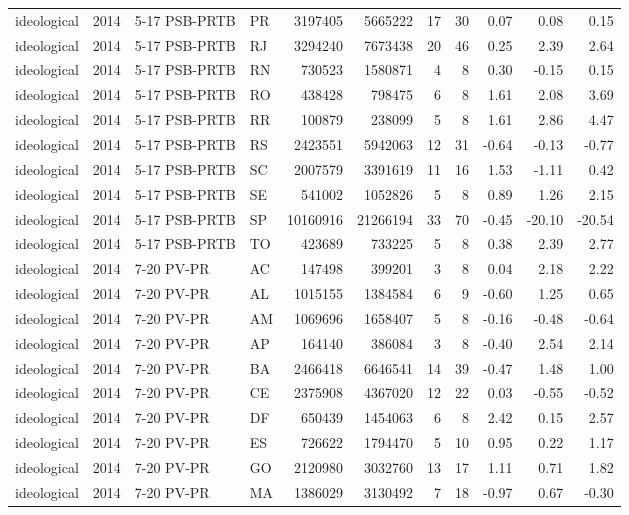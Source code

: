 \begin{landscape}
\begin{longtable}{lllL{1.4cm}rrrrrrr}
ideological & 2014 & 5-17 PSB-PRTB & PR & 3197405 & 5665222 & 17 & 30 & 0.07 & 0.08 & 0.15 \\
ideological & 2014 & 5-17 PSB-PRTB & RJ & 3294240 & 7673438 & 20 & 46 & 0.25 & 2.39 & 2.64 \\
ideological & 2014 & 5-17 PSB-PRTB & RN & 730523 & 1580871 & 4 & 8 & 0.30 & -0.15 & 0.15 \\
ideological & 2014 & 5-17 PSB-PRTB & RO & 438428 & 798475 & 6 & 8 & 1.61 & 2.08 & 3.69 \\
ideological & 2014 & 5-17 PSB-PRTB & RR & 100879 & 238099 & 5 & 8 & 1.61 & 2.86 & 4.47 \\
ideological & 2014 & 5-17 PSB-PRTB & RS & 2423551 & 5942063 & 12 & 31 & -0.64 & -0.13 & -0.77 \\
ideological & 2014 & 5-17 PSB-PRTB & SC & 2007579 & 3391619 & 11 & 16 & 1.53 & -1.11 & 0.42 \\
ideological & 2014 & 5-17 PSB-PRTB & SE & 541002 & 1052826 & 5 & 8 & 0.89 & 1.26 & 2.15 \\
ideological & 2014 & 5-17 PSB-PRTB & SP & 10160916 & 21266194 & 33 & 70 & -0.45 & -20.10 & -20.54 \\
ideological & 2014 & 5-17 PSB-PRTB & TO & 423689 & 733225 & 5 & 8 & 0.38 & 2.39 & 2.77 \\
ideological & 2014 & 7-20 PV-PR & AC & 147498 & 399201 & 3 & 8 & 0.04 & 2.18 & 2.22 \\
ideological & 2014 & 7-20 PV-PR & AL & 1015155 & 1384584 & 6 & 9 & -0.60 & 1.25 & 0.65 \\
ideological & 2014 & 7-20 PV-PR & AM & 1069696 & 1658407 & 5 & 8 & -0.16 & -0.48 & -0.64 \\
ideological & 2014 & 7-20 PV-PR & AP & 164140 & 386084 & 3 & 8 & -0.40 & 2.54 & 2.14 \\
ideological & 2014 & 7-20 PV-PR & BA & 2466418 & 6646541 & 14 & 39 & -0.47 & 1.48 & 1.00 \\
ideological & 2014 & 7-20 PV-PR & CE & 2375908 & 4367020 & 12 & 22 & 0.03 & -0.55 & -0.52 \\
ideological & 2014 & 7-20 PV-PR & DF & 650439 & 1454063 & 6 & 8 & 2.42 & 0.15 & 2.57 \\
ideological & 2014 & 7-20 PV-PR & ES & 726622 & 1794470 & 5 & 10 & 0.95 & 0.22 & 1.17 \\
ideological & 2014 & 7-20 PV-PR & GO & 2120980 & 3032760 & 13 & 17 & 1.11 & 0.71 & 1.82 \\
ideological & 2014 & 7-20 PV-PR & MA & 1386029 & 3130492 & 7 & 18 & -0.97 & 0.67 & -0.30 \\

\end{longtable}
\end{landscape}

